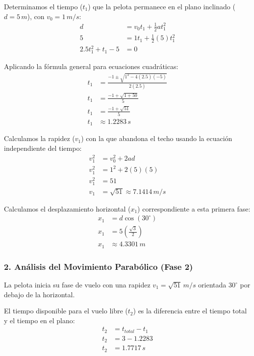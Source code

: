 \documentclass[12pt, a4paper]{article}
\begin{document}
Determinamos el tiempo ($t_1$) que la pelota permanece en el plano inclinado ($d = 5 \, \si{m}$), con $v_0 = 1 \, \si{m/s}$:
\begin{align*}
d &= v_0 t_1 + \frac{1}{2} a t_1^2 \\
5 &= 1 t_1 + \frac{1}{2} (5) t_1^2 \\
2.5 t_1^2 + t_1 - 5 &= 0
\end{align*}

Aplicando la fórmula general para ecuaciones cuadráticas:
\begin{align*}
t_1 &= \frac{-1 \pm \sqrt{1^2 - 4(2.5)(-5)}}{2(2.5)} \\
t_1 &= \frac{-1 + \sqrt{1 + 50}}{5} \\
t_1 &= \frac{-1 + \sqrt{51}}{5} \\
t_1 &\approx 1.2283 \, \si{s}
\end{align*}

Calculamos la rapidez ($v_1$) con la que abandona el techo usando la ecuación independiente del tiempo:
\begin{align*}
v_1^2 &= v_0^2 + 2ad \\
v_1^2 &= 1^2 + 2(5)(5) \\
v_1^2 &= 51 \\
v_1 &= \sqrt{51} \approx 7.1414 \, \si{m/s}
\end{align*}

Calculamos el desplazamiento horizontal ($x_1$) correspondiente a esta primera fase:
\begin{align*}
x_1 &= d \cos(30^\circ) \\
x_1 &= 5 \left(\frac{\sqrt{3}}{2}\right) \\
x_1 &\approx 4.3301 \, \si{m}
\end{align*}

\subsubsection*{2. Análisis del Movimiento Parabólico (Fase 2)}
La pelota inicia su fase de vuelo con una rapidez $v_1 = \sqrt{51} \, \si{m/s}$ orientada $30^\circ$ por debajo de la horizontal.

El tiempo disponible para el vuelo libre ($t_2$) es la diferencia entre el tiempo total y el tiempo en el plano:
\begin{align*}
t_2 &= t_{total} - t_1 \\
t_2 &= 3 - 1.2283 \\
t_2 &= 1.7717 \, \si{s}
\end{align*}
\end{document}
